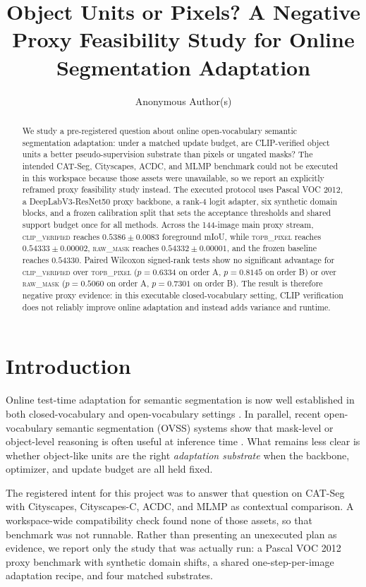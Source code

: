 \documentclass{article}
\title{Object Units or Pixels? A Negative Proxy Feasibility Study for Online Segmentation Adaptation}
\author{Anonymous Author(s)}
\newcommand{\method}{\textsc{clip\_verified}}
\newcommand{\topb}{\textsc{topb\_pixel}}
\newcommand{\rawmask}{\textsc{raw\_mask}}
\newcommand{\miou}{mIoU}
\begin{document}
\maketitle

\begin{abstract}
We study a pre-registered question about online open-vocabulary semantic segmentation adaptation: under a matched update budget, are CLIP-verified object units a better pseudo-supervision substrate than pixels or ungated masks? The intended CAT-Seg, Cityscapes, ACDC, and MLMP benchmark could not be executed in this workspace because those assets were unavailable, so we report an explicitly reframed proxy feasibility study instead. The executed protocol uses Pascal VOC 2012, a DeepLabV3-ResNet50 proxy backbone, a rank-4 logit adapter, six synthetic domain blocks, and a frozen calibration split that sets the acceptance thresholds and shared support budget once for all methods. Across the 144-image main proxy stream, \method{} reaches $0.5386 \pm 0.0083$ foreground \miou, while \topb{} reaches $0.54333 \pm 0.00002$, \rawmask{} reaches $0.54332 \pm 0.00001$, and the frozen baseline reaches $0.54330$. Paired Wilcoxon signed-rank tests show no significant advantage for \method{} over \topb{} ($p=0.6334$ on order A, $p=0.8145$ on order B) or over \rawmask{} ($p=0.5060$ on order A, $p=0.7301$ on order B). The result is therefore negative proxy evidence: in this executable closed-vocabulary setting, CLIP verification does not reliably improve online adaptation and instead adds variance and runtime.
\end{abstract}

\section{Introduction}
Online test-time adaptation for semantic segmentation is now well established in both closed-vocabulary and open-vocabulary settings \citep{das2023transadapt,sojka2023continuous,noori2025ttavlm,desilva2025tto}. In parallel, recent open-vocabulary semantic segmentation (OVSS) systems show that mask-level or object-level reasoning is often useful at inference time \citep{liang2023ovseg,xu2023san,shan2024ebseg,lee2024escnet,kim2024dsg}. What remains less clear is whether object-like units are the right \emph{adaptation substrate} when the backbone, optimizer, and update budget are all held fixed.

The registered intent for this project was to answer that question on CAT-Seg with Cityscapes, Cityscapes-C, ACDC, and MLMP as contextual comparison. A workspace-wide compatibility check found none of those assets, so that benchmark was not runnable. Rather than presenting an unexecuted plan as evidence, we report only the study that was actually run: a Pascal VOC 2012 proxy benchmark with synthetic domain shifts, a shared one-step-per-image adaptation recipe, and four matched substrates.
\end{document}
